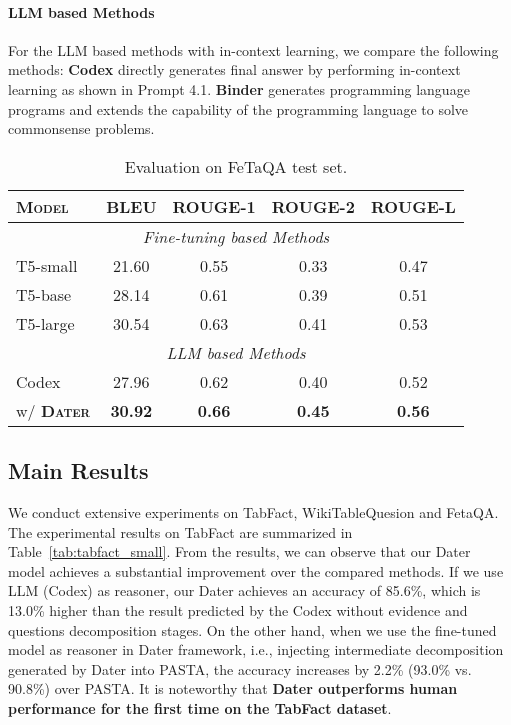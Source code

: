 \documentclass{article}
\begin{document}
\paragraph{ \textbf{LLM based Methods}} For the LLM based methods with in-context learning, we compare the following methods:
\textbf{Codex} \citep{codex} directly generates final answer by performing in-context learning as shown in Prompt 4.1.  
\textbf{Binder} \citep{binder} generates programming language programs and extends the capability of the programming language to solve commonsense problems. 


\begin{table}
  \centering
  \begin{tabular}{lcccc}
    \toprule
    \textsc{\textbf{Model}} & \textsc{\textbf{BLEU}} &  \textsc{\textbf{ROUGE-1}} & \textsc{\textbf{ROUGE-2}} & \textsc{\textbf{ROUGE-L}} \\
    \midrule
    \multicolumn{5}{c}{\textit{ Fine-tuning based Methods}} \\
    T5-small    &   21.60   &   0.55    &   0.33    &   0.47    \\
    T5-base     &   28.14   &   0.61    &   0.39    &   0.51    \\
    T5-large    &   30.54   &   0.63    &   0.41    &   0.53    \\
    \midrule
    \multicolumn{5}{c}{\textit{  LLM based Methods}} \\
    Codex & 27.96  &   0.62   &   0.40   &0.52      \\
    \rowcolor[RGB]{237,237,237} \quad w/ \textbf{\textsc{Dater}}   &   \textbf{30.92}    &   \textbf{0.66}   &   \textbf{0.45}    &    \textbf{0.56}    \\
    \bottomrule
  \end{tabular}
  \vspace{0.2cm}
  \caption{Evaluation on FeTaQA test set.}
  \label{tab:fetaqa}
\end{table}

\subsection{Main Results}
We conduct extensive experiments on TabFact, WikiTableQuesion and FetaQA. The experimental results on TabFact are summarized in Table~\ref{tab:tabfact_small}. From the results, we can observe that our Dater model achieves a substantial improvement over the compared methods. 
If we use LLM (Codex) as reasoner, our Dater achieves an accuracy of 85.6\%, which is 13.0\% higher than the result predicted by the Codex without evidence and questions decomposition stages. 
On the other hand, when we use the fine-tuned model as reasoner in Dater framework, i.e., injecting intermediate decomposition generated by Dater into PASTA, the accuracy increases by 2.2\% (93.0\% vs. 90.8\%) over PASTA.
It is noteworthy that \textbf{Dater outperforms human performance for the first time on the TabFact dataset}.  
\end{document}

